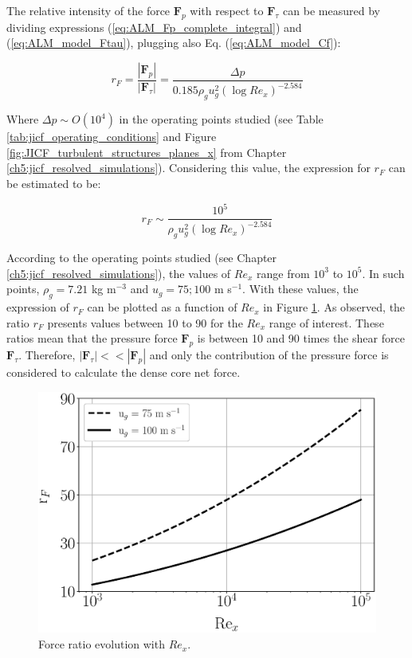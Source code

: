 The relative intensity of the force $\boldsymbol{F}_p$ with respect to $\boldsymbol{F}_\tau$ can be measured by dividing expressions (\ref{eq:ALM_Fp_complete_integral}) and (\ref{eq:ALM_model_Ftau}), plugging also Eq. (\ref{eq:ALM_model_Cf}):

\begin{equation}
\label{eq:rF_definition}
r_F = \frac{| \boldsymbol{F}_p| }{| \boldsymbol{F}_\tau |} = \frac{\Delta p}{0.185 \rho_g u_g^2 \left( \log Re_x \right)^{-2.584}}
\end{equation}


Where $\Delta p \sim O \left( 10^4 \right) $ in the operating points studied (see Table \ref{tab:jicf_operating_conditions} and Figure \ref{fig:JICF_turbulent_structures_planes_x} from Chapter \ref{ch5:jicf_resolved_simulations}). Considering this value, the expression for $r_F$ can be estimated to be:

\begin{equation}
r_F \sim \frac{10^5}{\rho_g u_g^2 \left( \log Re_x \right)^{-2.584}}
\end{equation}

According to the operating points studied (see Chapter \ref{ch5:jicf_resolved_simulations}), the values of $Re_x$ range from $10^3$ to $10^5$. In such points, $\rho_g = 7.21$ kg m$^{-3}$ and $u_g = 75; 100$ m s$^{-1}$. With these values, the expression of $r_F$ can be plotted as a function of $Re_x$ in Figure \ref{fig:ALM_rF_vs_Rex}. As observed, the ratio $r_F$ presents values between 10 to 90 for the $Re_x$ range of interest. These ratios mean that the pressure force $\boldsymbol{F}_p$ is between 10 and 90 times the shear force $\boldsymbol{F}_\tau$. Therefore, $|\boldsymbol{F}_\tau| << |\boldsymbol{F}_p|$ and only the contribution of the pressure force is considered to calculate the dense core net force.




\begin{figure}[h!]
	\centering
	\includegraphics[scale=0.5]{./part2_developments/figures_ch4_SLI/ALM_rF_vs_Rex.eps}
	\caption{Force ratio evolution with $Re_x$.}
	\label{fig:ALM_rF_vs_Rex}
\end{figure}


